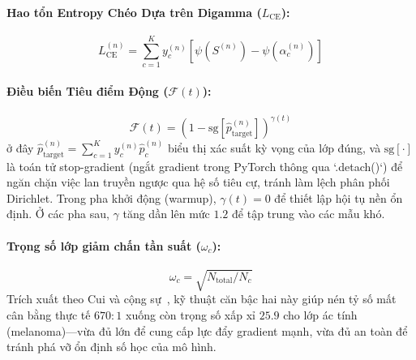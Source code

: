 \documentclass[11pt, a4paper]{article}
\begin{document}
\paragraph{Hao tổn Entropy Chéo Dựa trên Digamma ($L_{\text{CE}}$):}
\begin{equation}
    L_{\text{CE}}^{(n)} = \sum_{c=1}^K y_c^{(n)} \left[\psi(S^{(n)}) - \psi(\alpha_c^{(n)})\right]
\end{equation}

\paragraph{Điều biến Tiêu điểm Động ($\mathcal{F}(t)$):}
\begin{equation}
    \mathcal{F}(t) = \left(1 - \text{sg}[\hat{p}_{\text{target}}^{(n)}]\right)^{\gamma(t)}
\end{equation}
ở đây $\hat{p}_{\text{target}}^{(n)} = \sum_{c=1}^K y_c^{(n)} \hat{p}_c^{(n)}$ biểu thị xác suất kỳ vọng của lớp đúng, và $\text{sg}[\cdot]$ là toán tử stop-gradient (ngắt gradient trong PyTorch thông qua `.detach()`) để ngăn chặn việc lan truyền ngược qua hệ số tiêu cự, tránh làm lệch phân phối Dirichlet. Trong pha khởi động (warmup), $\gamma(t) = 0$ để thiết lập hội tụ nền ổn định. Ở các pha sau, $\gamma$ tăng dần lên mức $1.2$ để tập trung vào các mẫu khó.

\paragraph{Trọng số lớp giảm chấn tần suất ($\omega_c$):}
\begin{equation}\label{eq:class_weights}
    \omega_c = \sqrt{N_{\text{total}} / N_c}
\end{equation}
Trích xuất theo Cui và cộng sự~\cite{cui2019class}, kỹ thuật căn bậc hai này giúp nén tỷ số mất cân bằng thực tế $670{:}1$ xuống còn trọng số xấp xỉ $25.9$ cho lớp ác tính (melanoma)---vừa đủ lớn để cung cấp lực đẩy gradient mạnh, vừa đủ an toàn để tránh phá vỡ ổn định số học của mô hình.
\end{document}
